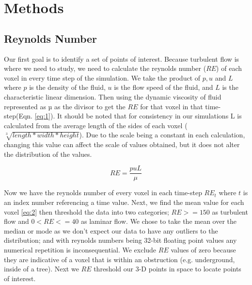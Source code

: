 
\chapter{Methods} %

\label{Chapter2} %


\section{Reynolds Number}

Our first goal is to identify a set of points of interest. Because turbulent flow is where we need to study, we need to calculate the reynolds number (\ensuremath{RE}) of each voxel in every time step of the simulation. We take the product of \ensuremath{p, u} and \ensuremath{L} where \ensuremath{p} is the density of the fluid, \ensuremath{u} is the flow speed of the fluid, and \ensuremath{L} is the characteristic linear dimension. Then using the dynamic viscosity of fluid represented as µ as the divisor to get the \ensuremath{RE} for that voxel in that time-step(Eqn. \ref{eq:1}). It should be noted that for consistency in our simulations L is calculated from the average length of the sides of each voxel (\ensuremath{\sqrt[3]{length * width * height}}). Due to the scale being a constant in each calculation, changing this value can affect the scale of values obtained, but it does not alter the distribution of the values. 


\begin{equation}\label{eq:1}
RE  = \frac{puL} {\mu} 
\end{equation}


Now we have the reynolds number of every voxel in each time-step \ensuremath{RE_t} where \ensuremath{t} is an index number referencing a time value. Next, we find the mean value for each voxel \ref{eq:2} then threshold the data into two categories; \ensuremath{RE >= 150} as turbulent flow and \ensuremath{0 < RE <= 40} as laminar flow. We chose to take the mean over the median or mode as we don't expect our data to have any outliers to the distribution; and with reynolds numbers being 32-bit floating point values any numerical repetition is inconsequential. We exclude \ensuremath{RE} values of zero because they are indicative of a voxel that is within an obstruction (e.g. underground, inside of a tree). Next we \ensuremath{RE} threshold our 3-D points in space to locate points of interest.


